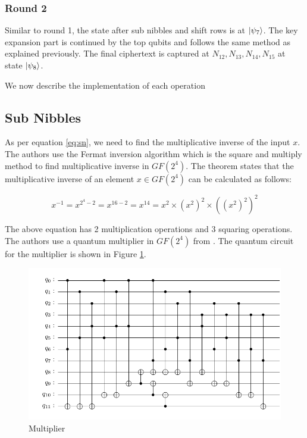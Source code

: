 \documentclass[preprint]{transcrypto}
\begin{document}
\subsubsection{Round 2}
Similar to round 1, the state after sub nibbles and shift rows is at $\ket{\psi_7}$. The key expansion part is continued by the top qubits and follows the same method as explained previously. The final ciphertext is captured at $N_{12},N_{13},N_{14},N_{15}$ at state $\ket{\psi_8}$.


We now describe the implementation of each operation

\subsection{Sub Nibbles}

As per equation \ref{eq:sn}, we need to find the multiplicative inverse of the input $x$. The authors use the Fermat inversion algorithm which is the square and multiply method to find multiplicative inverse in $GF(2^4)$. The theorem states that the multiplicative inverse of an element $x \in GF(2^4)$ can be calculated as follows:

\begin{equation*}
    x^{-1} = x^{2^4 - 2} = x^{16-2} = x^{14} = x^{2} \times (x^{2})^{2} \times ((x^{2})^{2})^{2}
\end{equation*}

The above equation has 2 multiplication operations and 3 squaring operations. The authors use a quantum multiplier in $GF(2^4)$ from \cite{Cheung}. The quantum circuit for the multiplier is shown in Figure \ref{fig:mul}. 


\begin{figure}[h!]
    \centering
    \includegraphics[width=\linewidth]{saes18/multiplier.pdf}
    \caption{Multiplier}
    \label{fig:mul}
\end{figure}
\end{document}
